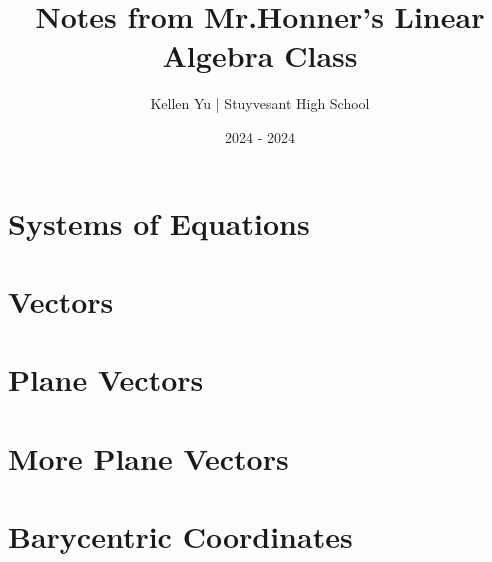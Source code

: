 \documentclass[12pt]{book}
\title{Notes from Mr.Honner's Linear Algebra Class}
\author{Kellen Yu | Stuyvesant High School}
\date{2024 - 2024}
\begin{document}
    \maketitle
    \tableofcontents
    \section{Systems of Equations}
    
    \section{Vectors}
    
    \section{Plane Vectors}
    
    \section{More Plane Vectors}
    
    \section{Barycentric Coordinates}
    
\end{document}
